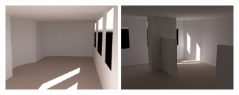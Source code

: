 \begin{figure}%
\newcommand{\figwidth}{1.7in}
\begin{center}
\includegraphics[width=\figwidth]{C_A6_2026obj_march_CROPPED}
\includegraphics[width=\figwidth]{C_A2_FIXED_2020obj_march_CROPPED}\vspace{-0.2in}\\
\begin{minipage}{\figwidth}~{\color{white}{\bf A6}}\end{minipage} 
\begin{minipage}{\figwidth}~{\color{white}{\bf A2}}\end{minipage}\vspace{0.05in}\\

\end{center}
\end{figure}
